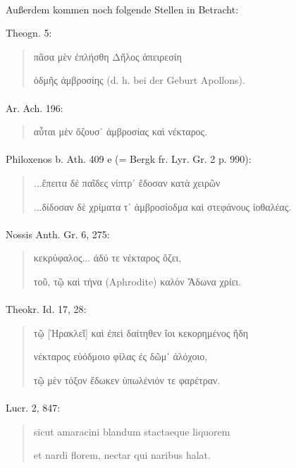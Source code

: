 \documentclass[a4paper, 11pt, oneside]{article}
\begin{document}
\paragraph{}
Außerdem kommen noch folgende Stellen in Betracht:

Theogn. 5:
\begin{quotation}\large
πᾶσα μὲν ἐπλήσθη Δῆλος ἀπειρεσίη

ὀδμῆς ἀμβροσίης (d. h. bei der Geburt Apollons).
\end{quotation}
\paragraph{}
Ar. Ach. 196:
\begin{quotation}\large
αὗται μὲν ὄζουσ᾽ ἀμβροσίας καὶ νέκταρος.
\end{quotation}
\paragraph{}
Philoxenos b. Ath. 409 e (= Bergk fr. Lyr. Gr. 2 p. 990):
\begin{quotation}\large
...ἔπειτα δὲ παῖδες νίπτρ᾽ ἔδοσαν κατὰ χειρῶν

...δίδοσαν δὲ χρίματα τ᾿ ἀμβροσίοδμα καὶ στεφάνους ἰοθαλέας.
\end{quotation}
\paragraph{}
Nossis Anth. Gr. 6, 275:
\begin{quotation}\large
κεκρύφαλος... ἀδύ τε νέκταρος ὄζει,

τοῦ, τῷ καὶ τήνα (Aphrodite) καλὸν Ἄδωνα χρίει.
\end{quotation}
\paragraph{}
Theokr. Id. 17, 28:
\begin{quotation}\large
τῷ [Ἡρακλεῖ] καὶ ἐπεὶ δαίτηθεν ἴοι κεκορημένος ἤδη

νέκταρος εὐόδμοιο φίλας ἐς δῶμ᾽ ἀλόχοιο,

τῷ μὲν τόξον ἔδωκεν ὑπωλένιόν τε φαρέτραν.
\end{quotation}
\paragraph{}
Lucr. 2, 847:
\begin{quotation}\large
sicut amaracini blandum stactaeque liquorem

et nardi florem, nectar qui naribus halat.
\end{quotation}
\end{document}
